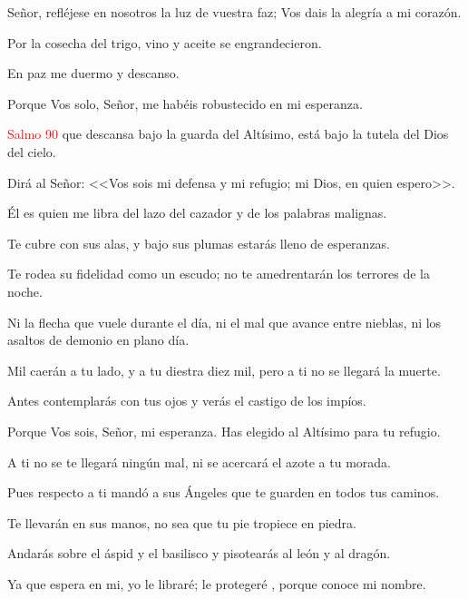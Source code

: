 \documentclass[9pt]{article}
\begin{document}
\begin{multicols}{2}
      Señor, refléjese en nosotros la luz de vuestra faz; Vos dais la alegría a mi corazón.

      Por la cosecha del trigo, vino y aceite se engrandecieron.

      En paz me duermo y descanso.

      Porque Vos solo, Señor, me habéis robustecido en mi esperanza.

      \vspace{1mm}

      \begin{otherlanguage}{latin}
            
      \end{otherlanguage}

      \vspace{1mm}

      \hfill\textcolor{red}{Salmo 90}
      que descansa bajo la guarda del Altísimo, está bajo la tutela del Dios del cielo.

      Dirá al Señor: <<Vos sois mi defensa y mi refugio; mi Dios, en quien espero>>.

      Él es quien me libra del lazo del cazador y de los palabras malignas.

      Te cubre con sus alas, y bajo sus plumas estarás lleno de esperanzas.

      Te rodea su fidelidad como un escudo; no te amedrentarán los terrores de la noche.

      Ni la flecha que vuele durante el día, ni el mal que avance entre nieblas, ni los asaltos de demonio en plano día.

      Mil caerán a tu lado, y a tu diestra diez mil, pero a ti no se llegará la muerte.

      Antes contemplarás con tus ojos y verás el castigo de los impíos.

      Porque Vos sois, Señor, mi esperanza. Has elegido al Altísimo para tu refugio.

      A ti no se te llegará ningún mal, ni se acercará el azote a tu morada.

      Pues respecto a ti mandó a sus Ángeles que te guarden en todos tus caminos.

      Te llevarán en sus manos, no sea que tu pie tropiece en piedra.

      Andarás sobre el áspid y el basilisco y pisotearás al león y al dragón.

      Ya que espera en mi, yo le libraré; le protegeré , porque conoce mi nombre.


\end{multicols}
\end{document}
